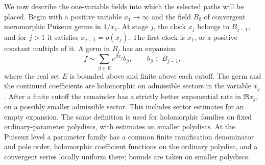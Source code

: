 We now describe the one-variable fields into which the selected paths
will be placed.  Begin with a positive variable \(x_1\to\infty\) and
the field \(B_0\) of convergent meromorphic Puiseux germs in \(1/x_1\).
At stage \(j\), the clock \(x_j\) belongs to \(B_{j-1}\), and for
\(j>1\) it satisfies \(x_{j-1}=o(x_j)\).  The first clock is \(x_1\),
or a positive constant multiple of it.  A germ in \(B_j\) has an
expansion
\begin{equation}\label{path:eq-clock-series}
 f\sim\sum_{\beta\in E}e^{\beta x_j}b_\beta,
 \qquad b_\beta\in B_{j-1},
\end{equation}
where the real set \(E\) is bounded above and finite above each cutoff.
The germ and the continued coefficients are holomorphic on admissible
sectors in the variable \(x_j\).  After a finite cutoff the remainder
has a strictly better exponential rate in \(\Re x_j\), on a possibly
smaller admissible sector.  This includes sector estimates for an empty
expansion.  The same definition is used for holomorphic families on
fixed ordinary-parameter polydiscs, with estimates on smaller polydiscs.
At the Puiseux level a parameter family has a common finite
ramification denominator and pole order, holomorphic coefficient
functions on the ordinary polydisc, and a convergent series locally
uniform there; bounds are taken on smaller polydiscs.


